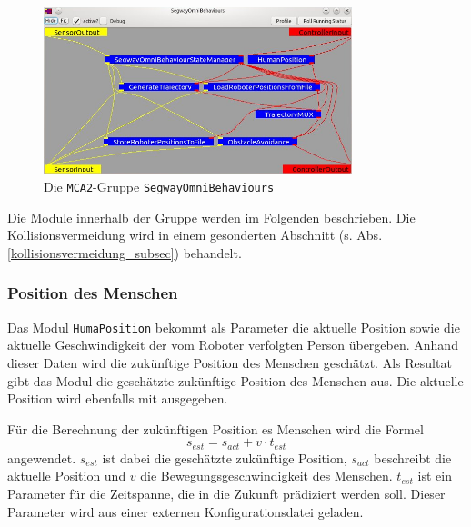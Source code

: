 \begin{figure}
	\center
	\includegraphics[width=0.8\textwidth]{graphics/behaviours}
	\caption{Die \lstinline{MCA2}-Gruppe \lstinline{SegwayOmniBehaviours}}
	\label{fig:behaviours}
\end{figure}

Die Module innerhalb der Gruppe werden im Folgenden beschrieben.
Die Kollisionsvermeidung wird in einem gesonderten Abschnitt (s. Abs. \ref{kollisionsvermeidung_subsec}) behandelt.


\subsubsection{Position des Menschen}


Das Modul \lstinline{HumaPosition} bekommt als Parameter die aktuelle Position sowie die aktuelle Geschwindigkeit der vom Roboter verfolgten Person übergeben.
Anhand dieser Daten wird die zukünftige Position des Menschen geschätzt.
Als Resultat gibt das Modul die geschätzte zukünftige Position des Menschen aus.
Die aktuelle Position wird ebenfalls mit ausgegeben.

Für die Berechnung der zukünftigen Position es Menschen wird die Formel
\begin{equation}
	s_{est} = s_{act} + v \cdot t_{est}
\end{equation}
angewendet.
$s_{est}$ ist dabei die geschätzte zukünftige Position, $s_{act}$ beschreibt die aktuelle Position und $v$ die Bewegungsgeschwindigkeit des Menschen.
$t_{est}$ ist ein Parameter für die Zeitspanne, die in die Zukunft prädiziert werden soll.
Dieser Parameter wird aus einer externen Konfigurationsdatei geladen.


